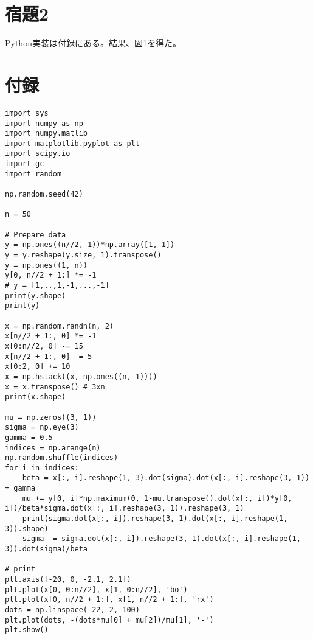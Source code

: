\documentclass[9pt]{ltjsarticle}
\begin{document}
\section*{宿題2}
Python実装は付録にある。結果、図1を得た。



\section*{付録}
\tiny
\begin{verbatim}
import sys
import numpy as np
import numpy.matlib
import matplotlib.pyplot as plt
import scipy.io
import gc
import random

np.random.seed(42)

n = 50

# Prepare data
y = np.ones((n//2, 1))*np.array([1,-1])
y = y.reshape(y.size, 1).transpose()
y = np.ones((1, n))
y[0, n//2 + 1:] *= -1
# y = [1,..,1,-1,...,-1]
print(y.shape)
print(y)

x = np.random.randn(n, 2)
x[n//2 + 1:, 0] *= -1
x[0:n//2, 0] -= 15
x[n//2 + 1:, 0] -= 5
x[0:2, 0] += 10
x = np.hstack((x, np.ones((n, 1))))
x = x.transpose() # 3xn
print(x.shape)

mu = np.zeros((3, 1))
sigma = np.eye(3)
gamma = 0.5
indices = np.arange(n)
np.random.shuffle(indices)
for i in indices:
    beta = x[:, i].reshape(1, 3).dot(sigma).dot(x[:, i].reshape(3, 1)) + gamma
    mu += y[0, i]*np.maximum(0, 1-mu.transpose().dot(x[:, i])*y[0, i])/beta*sigma.dot(x[:, i].reshape(3, 1)).reshape(3, 1)
    print(sigma.dot(x[:, i]).reshape(3, 1).dot(x[:, i].reshape(1, 3)).shape)
    sigma -= sigma.dot(x[:, i]).reshape(3, 1).dot(x[:, i].reshape(1, 3)).dot(sigma)/beta

# print
plt.axis([-20, 0, -2.1, 2.1])
plt.plot(x[0, 0:n//2], x[1, 0:n//2], 'bo')   
plt.plot(x[0, n//2 + 1:], x[1, n//2 + 1:], 'rx')   
dots = np.linspace(-22, 2, 100)
plt.plot(dots, -(dots*mu[0] + mu[2])/mu[1], '-')
plt.show()
\end{verbatim}
\end{document}
